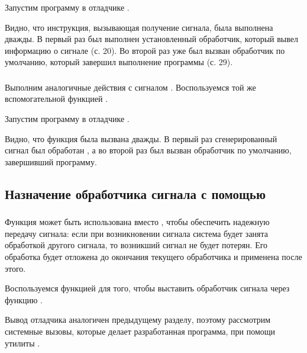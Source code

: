 
Запустим программу  в отладчике .


Видно, что инструкция, вызывающая получение сигнала, была выполнена дважды. В первый раз был выполнен установленный обработчик, который вывел информацию о сигнале (с. 20). Во второй раз уже был вызван обработчик по умолчанию, который завершил выполнение программы (с. 29).

\subsubsection{}

Выполним аналогичные действия с сигналом . Воспользуемся той же вспомогательной функцией .


Запустим программу  в отладчике .


Видно, что функция  была вызвана дважды. В первый раз сгенерированный сигнал был обработан , а во второй раз был вызван обработчик по умолчанию, завершивший программу.

\subsection{Назначение обработчика сигнала с помощью }

\subsubsection{}

Функция  может быть использована вместо , чтобы обеспечить надежную передачу сигнала: если при
возникновении сигнала система будет занята обработкой другого сигнала, то возникший сигнал не будет потерян. Его обработка будет отложена до окончания текущего обработчика и применена после этого.

Воспользуемся функцией  для того, чтобы выставить обработчик сигнала  через функцию .


Вывод отладчика  аналогичен предыдущему разделу, поэтому рассмотрим системные вызовы, которые делает разработанная программа, при помощи утилиты .

